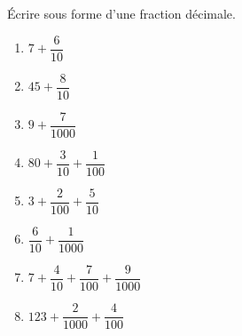 \begin{exercice}
    Écrire sous forme d'une fraction décimale. \smallskip
    \begin{multicols}{2}
      \begin{enumerate}
         \item $7+\dfrac{6}{10}$ \smallskip
         \item $45+\dfrac{8}{10}$ \smallskip
         \item $9+\dfrac{7}{\num{1 000}}$ \smallskip
         \item $80+\dfrac{3}{10}+\dfrac{1}{100}$ \smallskip
         \item $3+\dfrac{2}{100}+\dfrac{5}{10}$ \smallskip
         \item $\dfrac{6}{10}+\dfrac{1}{\num{1 000}}$ \smallskip
         \item $7+\dfrac{4}{10}+\dfrac{7}{100}+\dfrac{9}{\num{1 000}}$ \smallskip
         \item $123+\dfrac{2}{\num{1 000}}+\dfrac{4}{100}$
      \end{enumerate}
   \end{multicols}
 \end{exercice}